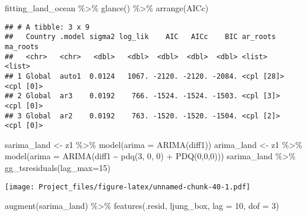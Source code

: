 \documentclass[
]{article}
\newenvironment{Shaded}{\begin{snugshade}}{\end{snugshade}}
\newcommand{\AttributeTok}[1]{\textcolor[rgb]{0.77,0.63,0.00}{#1}}
\newcommand{\DecValTok}[1]{\textcolor[rgb]{0.00,0.00,0.81}{#1}}
\newcommand{\FunctionTok}[1]{\textcolor[rgb]{0.00,0.00,0.00}{#1}}
\newcommand{\NormalTok}[1]{#1}
\newcommand{\OtherTok}[1]{\textcolor[rgb]{0.56,0.35,0.01}{#1}}
\newcommand{\SpecialCharTok}[1]{\textcolor[rgb]{0.00,0.00,0.00}{#1}}
\begin{document}
\begin{Shaded}
\begin{Highlighting}[]
\NormalTok{fitting\_land\_ocean }\SpecialCharTok{\%\textgreater{}\%} \FunctionTok{glance}\NormalTok{() }\SpecialCharTok{\%\textgreater{}\%} \FunctionTok{arrange}\NormalTok{(AICc)}
\end{Highlighting}
\end{Shaded}

\begin{verbatim}
## # A tibble: 3 x 9
##   Country .model sigma2 log_lik    AIC   AICc    BIC ar_roots   ma_roots 
##   <chr>   <chr>   <dbl>   <dbl>  <dbl>  <dbl>  <dbl> <list>     <list>   
## 1 Global  auto1  0.0124   1067. -2120. -2120. -2084. <cpl [28]> <cpl [0]>
## 2 Global  ar3    0.0192    766. -1524. -1524. -1503. <cpl [3]>  <cpl [0]>
## 3 Global  ar2    0.0192    763. -1520. -1520. -1504. <cpl [2]>  <cpl [0]>
\end{verbatim}

\begin{Shaded}
\begin{Highlighting}[]
\NormalTok{sarima\_land }\OtherTok{\textless{}{-}}\NormalTok{ z1 }\SpecialCharTok{\%\textgreater{}\%} \FunctionTok{model}\NormalTok{(}\AttributeTok{arima =} \FunctionTok{ARIMA}\NormalTok{(diff1))}
\NormalTok{arima\_land }\OtherTok{\textless{}{-}}\NormalTok{ z1 }\SpecialCharTok{\%\textgreater{}\%}  \FunctionTok{model}\NormalTok{(}\AttributeTok{arima =} \FunctionTok{ARIMA}\NormalTok{(diff1 }\SpecialCharTok{\textasciitilde{}} \FunctionTok{pdq}\NormalTok{(}\DecValTok{3}\NormalTok{, }\DecValTok{0}\NormalTok{, }\DecValTok{0}\NormalTok{) }\SpecialCharTok{+} \FunctionTok{PDQ}\NormalTok{(}\DecValTok{0}\NormalTok{,}\DecValTok{0}\NormalTok{,}\DecValTok{0}\NormalTok{))) }
\NormalTok{sarima\_land }\SpecialCharTok{\%\textgreater{}\%} \FunctionTok{gg\_tsresiduals}\NormalTok{(}\AttributeTok{lag\_max=}\DecValTok{15}\NormalTok{)}
\end{Highlighting}
\end{Shaded}

\texttt{[image: Project\_files/figure-latex/unnamed-chunk-40-1.pdf]}

\begin{Shaded}
\begin{Highlighting}[]
\FunctionTok{augment}\NormalTok{(sarima\_land) }\SpecialCharTok{\%\textgreater{}\%}
  \FunctionTok{features}\NormalTok{(.resid, ljung\_box, }\AttributeTok{lag =} \DecValTok{10}\NormalTok{, }\AttributeTok{dof =} \DecValTok{3}\NormalTok{)}
\end{Highlighting}
\end{Shaded}
\end{document}
